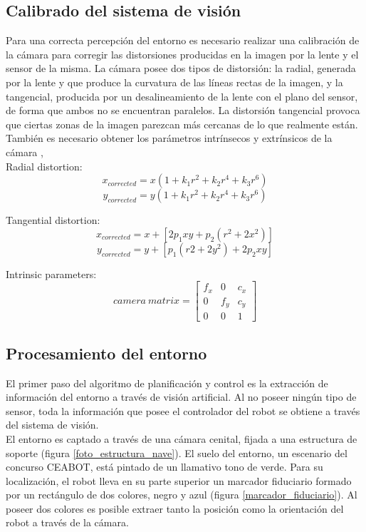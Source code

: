 \subsection{Calibrado del sistema de visión}
\label{calibrado}
Para una correcta percepción del entorno es necesario realizar una calibración de la cámara para corregir las distorsiones producidas en la imagen por la lente y el sensor de la misma. La cámara posee dos tipos de distorsión: la radial, generada por la lente y que produce la curvatura de las líneas rectas de la imagen, y la tangencial, producida por un desalineamiento de la lente con el plano del sensor, de forma que ambos no se encuentran paralelos. La distorsión tangencial provoca que ciertas zonas de la imagen parezcan más cercanas de lo que realmente están.\\

También es necesario obtener los parámetros intrínsecos  y extrínsicos de la cámara ,\\

Radial distortion:
\[x_{corrected} = x (1 + k_1 r^2 + k_2 r^4 + k_3 r^6)\]
\[y_{corrected} = y (1 + k_1 r^2 + k_2 r^4 + k_3 r^6)\]
 
 Tangential distortion:
\[x_{corrected} = x + \left[2 p_1 x y + p_2 (r^2 + 2 x^2) \right] \]
\[y_{corrected} = y + \left[p_1 (r2 + 2 y^2) + 2 p_2 x y \right] \]
  
Intrinsic parameters:
\[camera ~matrix = \begin{bmatrix} f_x & 0 & c_x \\ 0 & f_y & c_y \\ 0 & 0 & 1 \end{bmatrix}\]
\subsection{Procesamiento del entorno}
\label{procesamiento}

El primer paso del algoritmo de planificación y control es la extracción de información del entorno a través de visión artificial. Al no poseer ningún tipo de sensor, toda la información que posee el controlador del robot se obtiene a través del sistema de visión.\\

El entorno es captado a través de una cámara cenital, fijada a una estructura de soporte (figura \ref{foto_estructura_nave}). El suelo del entorno, un escenario del concurso CEABOT, está pintado de un llamativo tono de verde. Para su localización, el robot lleva en su parte superior un marcador fiduciario formado por un rectángulo de dos colores, negro y azul (figura \ref{marcador_fiduciario}). Al poseer dos colores es posible extraer tanto la posición como la orientación del robot a través de la cámara.\\

